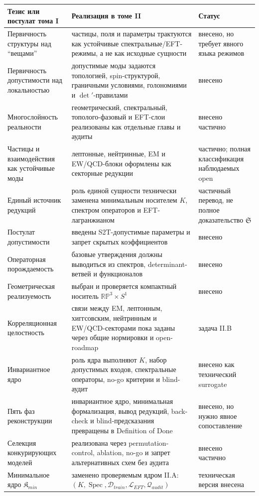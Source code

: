\documentclass[12pt,a4paper]{report}
\theoremstyle{remark}
\DeclareMathOperator{\Spec}{Spec}
\begin{document}
\begin{center}
\small
\begin{tabular}{>{\raggedright\arraybackslash}p{}>{\raggedright\arraybackslash}p{}>{\raggedright\arraybackslash}p{}}
\toprule
Тезис или постулат тома I & Реализация в томе II & Статус \\
\midrule
Первичность структуры над ``вещами'' & частицы, поля и параметры трактуются как устойчивые спектральные/EFT-режимы, а не как исходные сущности & внесено, но требует явного языка режимов \\
Первичность допустимости над локальностью & допустимые моды задаются топологией, spin-структурой, граничными условиями, голономиями и \(\det'\)-правилами & внесено \\
Многослойность реальности & геометрический, спектральный, тополого-фазовый и EFT-слои реализованы как отдельные главы и аудиты & внесено частично \\
Частицы и взаимодействия как устойчивые моды & лептонные, нейтринные, EM и EW/QCD-блоки оформлены как секторные редукции & частично; полная классификация наблюдаемых open \\
Единый источник редукций & роль единой сущности технически заменена минимальным носителем \(K\), спектром операторов и EFT-лагранжианом & частичный перевод, не полное доказательство \(\mathfrak S\) \\
Постулат допустимости & введены S2T-допустимые параметры и запрет скрытых коэффициентов & внесено \\
Операторная порождаемость & базовые утверждения должны выводиться из спектров, determinant-ветвей и функционалов & внесено \\
Геометрическая реализуемость & выбран и проверяется компактный носитель \(\mathbb{RP}^3\times S^1\) & внесено \\
Корреляционная целостность & связи между EM, лептонным, хиггсовским, нейтринным и EW/QCD-секторами пока заданы через общие нормировки и open-roadmap & задача II.B \\
Инвариантное ядро & роль ядра выполняют \(K\), набор допустимых входов, спектральные операторы, no-go критерии и blind-аудит & внесено как технический surrogate \\
Пять фаз реконструкции & инвариантное ядро, минимальная формализация, вывод редукций, back-check и blind-предсказания превращены в Definition of Done & внесено, но нужно явное сопоставление \\
Селекция конкурирующих моделей & реализована через permutation-control, ablation, no-go и запрет альтернативных схем без аудита & внесено частично \\
Минимальное ядро \(\mathfrak K_{min}\) & заменено проверяемым ядром II.A: \((K,\Spec,\mathcal D_{train},\mathcal L_{EFT},\mathcal Q_{audit})\) & техническая версия внесена \\
\bottomrule
\end{tabular}
\end{center}
\end{document}
